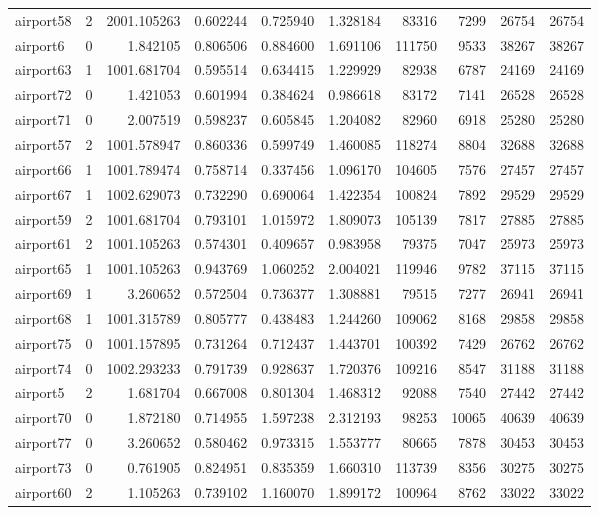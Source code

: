 \begin{longtable}{|l|r|r|r|r|r|r|r|r|r|}
airport58 & 2 & 2001.105263 & 0.602244 & 0.725940 & 1.328184 & 83316 & 7299 & 26754 & 26754 \\
airport6 & 0 & 1.842105 & 0.806506 & 0.884600 & 1.691106 & 111750 & 9533 & 38267 & 38267 \\
airport63 & 1 & 1001.681704 & 0.595514 & 0.634415 & 1.229929 & 82938 & 6787 & 24169 & 24169 \\
airport72 & 0 & 1.421053 & 0.601994 & 0.384624 & 0.986618 & 83172 & 7141 & 26528 & 26528 \\
airport71 & 0 & 2.007519 & 0.598237 & 0.605845 & 1.204082 & 82960 & 6918 & 25280 & 25280 \\
airport57 & 2 & 1001.578947 & 0.860336 & 0.599749 & 1.460085 & 118274 & 8804 & 32688 & 32688 \\
airport66 & 1 & 1001.789474 & 0.758714 & 0.337456 & 1.096170 & 104605 & 7576 & 27457 & 27457 \\
airport67 & 1 & 1002.629073 & 0.732290 & 0.690064 & 1.422354 & 100824 & 7892 & 29529 & 29529 \\
airport59 & 2 & 1001.681704 & 0.793101 & 1.015972 & 1.809073 & 105139 & 7817 & 27885 & 27885 \\
airport61 & 2 & 1001.105263 & 0.574301 & 0.409657 & 0.983958 & 79375 & 7047 & 25973 & 25973 \\
airport65 & 1 & 1001.105263 & 0.943769 & 1.060252 & 2.004021 & 119946 & 9782 & 37115 & 37115 \\
airport69 & 1 & 3.260652 & 0.572504 & 0.736377 & 1.308881 & 79515 & 7277 & 26941 & 26941 \\
airport68 & 1 & 1001.315789 & 0.805777 & 0.438483 & 1.244260 & 109062 & 8168 & 29858 & 29858 \\
airport75 & 0 & 1001.157895 & 0.731264 & 0.712437 & 1.443701 & 100392 & 7429 & 26762 & 26762 \\
airport74 & 0 & 1002.293233 & 0.791739 & 0.928637 & 1.720376 & 109216 & 8547 & 31188 & 31188 \\
airport5 & 2 & 1.681704 & 0.667008 & 0.801304 & 1.468312 & 92088 & 7540 & 27442 & 27442 \\
airport70 & 0 & 1.872180 & 0.714955 & 1.597238 & 2.312193 & 98253 & 10065 & 40639 & 40639 \\
airport77 & 0 & 3.260652 & 0.580462 & 0.973315 & 1.553777 & 80665 & 7878 & 30453 & 30453 \\
airport73 & 0 & 0.761905 & 0.824951 & 0.835359 & 1.660310 & 113739 & 8356 & 30275 & 30275 \\
airport60 & 2 & 1.105263 & 0.739102 & 1.160070 & 1.899172 & 100964 & 8762 & 33022 & 33022 \\

\end{longtable}
